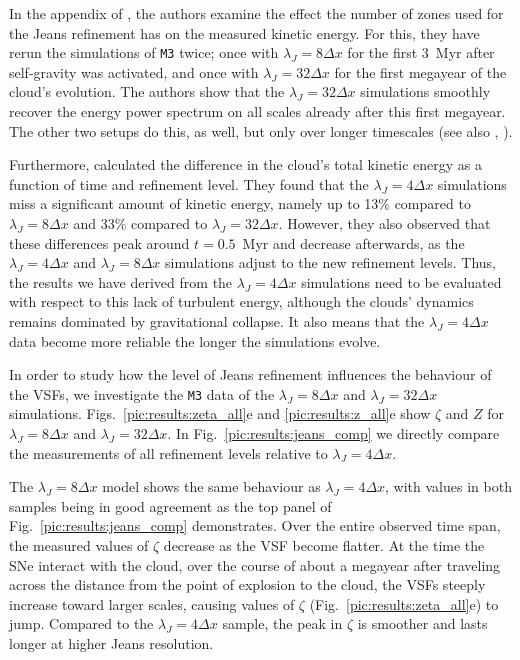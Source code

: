 In the appendix of , the authors examine the effect the number of zones used for the Jeans refinement has on the measured kinetic energy.
For this, they have rerun the simulations of \texttt{M3} twice; 
once with $\lambda_J=8\Delta{}x$ for the first 3~Myr after self-gravity was activated, and once with $\lambda_J=32\Delta{}x$ for the first megayear of the cloud's evolution.
The authors show that the $\lambda_J=32\Delta{}x$ simulations smoothly recover the energy power spectrum on all scales already after this first megayear.
The other two setups do this, as well, but only over longer timescales (see also , \citealt{Seifried2017b}).

Furthermore,  calculated the difference in the cloud's total kinetic energy as a function of time and refinement level.
They found that the $\lambda_J = 4\Delta{}x$ simulations miss a significant amount of kinetic energy, namely up to 13\% compared to $\lambda_J = 8\Delta{}x$ and 33\% compared to $\lambda_J = 32\Delta{}x$.
However, they also observed that these differences peak around $t=0.5$~Myr and decrease afterwards, as the $\lambda_J = 4\Delta{}x$ and $\lambda_J = 8\Delta{}x$ simulations adjust to the new refinement levels.
Thus, the results we have derived from the $\lambda_J = 4\Delta{}x$ simulations need to be evaluated with respect to this lack of turbulent energy, although the clouds' dynamics remains dominated by gravitational collapse.
It also means that the $\lambda_J = 4\Delta{}x$ data become more reliable the longer the simulations evolve.

In order to study  how the level of Jeans refinement influences the behaviour of the VSFs, we investigate the \texttt{M3} data of the $\lambda_J = 8\Delta{}x$ and $\lambda_J = 32\Delta{}x$ simulations.
Figs.~\ref{pic:results:zeta_all}e and \ref{pic:results:z_all}e show $\zeta$ and $Z$ for  $\lambda_J = 8\Delta{}x$ and $\lambda_J = 32\Delta{}x$.
In Fig.~\ref{pic:results:jeans_comp} we directly compare the measurements of all refinement levels relative to $\lambda_J = 4\Delta{}x$.

The $\lambda_J = 8\Delta{}x$ model shows the same behaviour as $\lambda_J = 4\Delta{}x$, with values in both samples being in good agreement as the top panel of Fig.~\ref{pic:results:jeans_comp} demonstrates. 
Over the entire observed time span, the measured values of $\zeta$ decrease as the VSF become flatter.
At the time the SNe interact with the cloud, over the course of about a megayear after traveling across the distance from the point of explosion to the cloud, the VSFs steeply increase toward larger scales, causing values of $\zeta$ (Fig.~\ref{pic:results:zeta_all}e) to jump.
Compared to the $\lambda_J = 4\Delta{}x$ sample, the peak in $\zeta$ is smoother and lasts longer at higher Jeans resolution.

